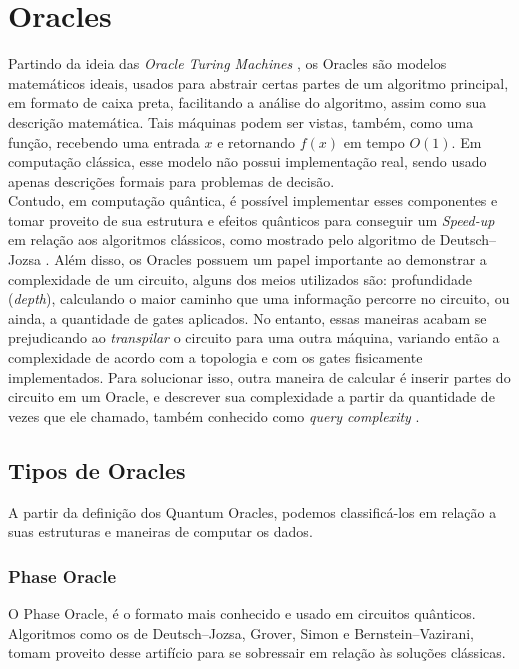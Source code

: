 \documentclass{article}
\begin{document}
\section{Oracles}
Partindo da ideia das \emph{Oracle Turing Machines} \cite{SOARE2009368}\cite{amreen_oracle}\cite{kalyanasyndaram_2021_mod04lec23}\cite{e21080800}, os Oracles são modelos matemáticos ideais, usados para abstrair certas partes de um algoritmo principal, em formato de caixa preta, facilitando a análise do algoritmo, assim como sua descrição matemática. Tais máquinas podem ser vistas, também, como uma função, recebendo uma entrada $x$ e retornando $f(x)$ em tempo $O(1)$. Em computação clássica, esse modelo não possui implementação real, sendo usado apenas descrições formais para problemas de decisão.\\
Contudo, em computação quântica, é possível implementar esses componentes e tomar proveito de sua estrutura e efeitos quânticos para conseguir um \emph{Speed-up} em relação aos algoritmos clássicos, como mostrado pelo algoritmo de Deutsch–Jozsa \cite{Fan_2007}. Além disso, os Oracles possuem um papel importante ao demonstrar a complexidade de um circuito, alguns dos meios utilizados são: profundidade (\emph{depth}), calculando o maior caminho que uma informação percorre no circuito, ou ainda, a quantidade de gates aplicados. No entanto, essas maneiras acabam se prejudicando ao \emph{transpilar} o circuito para uma outra máquina, variando então a complexidade de acordo com a topologia e com os gates fisicamente implementados. Para solucionar isso, outra maneira de calcular é inserir partes do circuito em um Oracle, e descrever sua complexidade a partir da quantidade de vezes que ele chamado, também conhecido como \emph{query complexity} \cite{odonnell_2015_lecture} \cite{e21080800}.

\subsection{Tipos de Oracles}
A partir da definição dos Quantum Oracles, podemos classificá-los em relação a suas estruturas e maneiras de computar os dados.

\subsubsection{Phase Oracle}
O Phase Oracle, é o formato mais conhecido e usado em circuitos quânticos. Algoritmos como os de  Deutsch–Jozsa, Grover, Simon e Bernstein–Vazirani, tomam proveito desse artifício para se sobressair em relação às soluções clássicas. 
\end{document}
